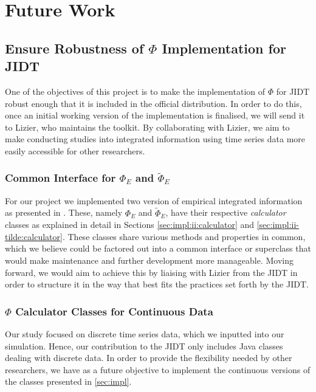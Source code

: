 \documentclass[a4paper,11pt]{article}
\begin{document}
\clearpage

\section{Future Work}
\label{sec:fw}

\subsection{Ensure Robustness of $\Phi$ Implementation for JIDT}
\label{sec:fw:jidt}
One of the objectives of this project is to make the implementation of $\Phi$ for JIDT robust enough that it is included in the official distribution. In order to do this, once an initial working version of the implementation is finalised, we will send it to Lizier, who maintains the toolkit. By collaborating with Lizier, we aim to make conducting studies into integrated information using time series data more easily accessible for other researchers.

\subsubsection{Common Interface for $\Phi_E$ and $\widetilde{\Phi}_E$}
\label{sec:fw:jidt:interface}
For our project we implemented two version of empirical integrated information as presented in \cite{Barrett2011}. These, namely $\Phi_E$ and $\widetilde{\Phi}_E$, have their respective \textit{calculator} classes as explained in detail in Sections \ref{sec:impl:ii:calculator} and \ref{sec:impl:ii-tilde:calculator}. These classes share various methods and properties in common, which we believe could be factored out into a common interface or superclass that would make maintenance and further development more manageable. Moving forward, we would aim to achieve this by liaising with Lizier from the JIDT in order to structure it in the way that best fits the practices set forth by the JIDT.

\subsubsection{$\Phi$ Calculator Classes for Continuous Data}
\label{sec:fw:jidt:continuous}
Our study focused on discrete time series data, which we inputted into our simulation. Hence, our contribution to the JIDT only includes Java classes dealing with discrete data. In order to provide the flexibility needed by other researchers, we have as a future objective to implement the continuous versions of the classes presented in \ref{sec:impl}.
\end{document}
